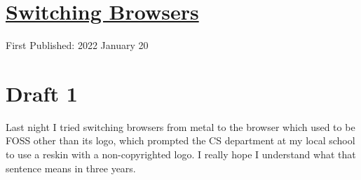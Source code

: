 \documentclass[12pt]{article}[titlepage]
\newcommand{\1}{\={a}}
\newcommand{\2}{\={e}}
\newcommand{\3}{\={\i}}
\newcommand{\4}{\=o}
\newcommand{\5}{\=u}
\newcommand{\6}{\={A}}
\renewcommand{\,}{\textsuperscript{,}}
\begin{document}
\doublespacing
\section{\href{switching-browsers.html}{Switching Browsers}}
First Published: 2022 January 20

\section{Draft 1}
Last night I tried switching browsers from metal to the browser which used to be FOSS other than its logo, which prompted the CS department at my local school to use a reskin with a non-copyrighted logo.
I really hope I understand what that sentence means in three years.
\end{document}
